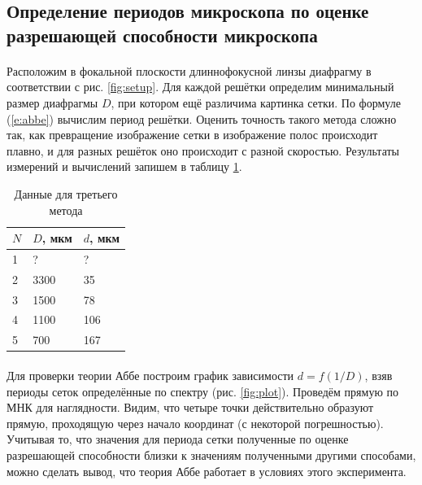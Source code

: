 \documentclass[a4paper,12pt]{article} %
\begin{document}
\subsection{Определение периодов микроскопа по оценке разрешающей способности микроскопа}

\paragraph{} Расположим в фокальной плоскости длиннофокусной линзы диафрагму в соответствии с рис. \ref{fig:setup}. Для каждой решётки определим минимальный размер диафрагмы $D$, при котором ещё различима картинка сетки. По формуле (\ref{e:abbe}) вычислим период решётки. Оценить точность такого метода сложно так, как превращение изображение сетки в изображение полос происходит плавно, и для разных решёток оно происходит с разной скоростью. Результаты измерений и вычислений запишем в таблицу \ref{tab:3met}.

\begin{table}[]
\centering
\begin{tabular}{|l|l|l|}
\hline
$N$ & $D$, мкм & $d$, мкм \\ \hline
1   & ?        & ?        \\ \hline
2   & 3300     & 35       \\ \hline
3   & 1500     & 78       \\ \hline
4   & 1100     & 106      \\ \hline
5   & 700      & 167      \\ \hline
\end{tabular}
\caption{Данные для третьего метода}
\label{tab:3met}
\end{table}

\paragraph{} Для проверки теории Аббе построим график зависимости $d = f(1/D)$, взяв периоды сеток определённые по спектру (рис. \ref{fig:plot}). Проведём прямую по МНК для наглядности. Видим, что четыре точки действительно образуют прямую, проходящую через начало координат (с некоторой погрешностью). Учитывая то, что значения для периода сетки полученные по оценке разрешающей способности близки к значениям полученными другими способами, можно сделать вывод, что теория Аббе работает в условиях этого эксперимента.
\end{document}
